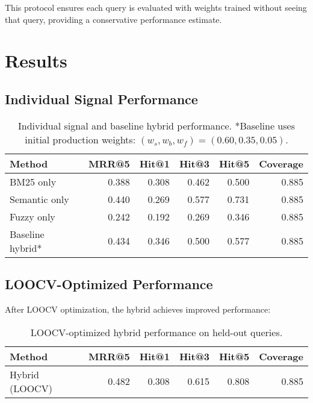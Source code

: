 This protocol ensures each query is evaluated with weights trained without seeing that query, providing a conservative performance estimate.

\section{Results}
\label{sec:evaluation-results}

\subsection{Individual Signal Performance}

\begin{table}[H]
\centering
\small
\begin{tabular}{lrrrrr}
\toprule
\textbf{Method} & \textbf{MRR@5} & \textbf{Hit@1} & \textbf{Hit@3} & \textbf{Hit@5} & \textbf{Coverage} \\
\midrule
BM25 only      & 0.388 & 0.308 & 0.462 & 0.500 & 0.885 \\
Semantic only  & 0.440 & 0.269 & 0.577 & 0.731 & 0.885 \\
Fuzzy only     & 0.242 & 0.192 & 0.269 & 0.346 & 0.885 \\
\addlinespace
Baseline hybrid* & 0.434 & 0.346 & 0.500 & 0.577 & 0.885 \\
\bottomrule
\end{tabular}
\caption{Individual signal and baseline hybrid performance. *Baseline uses initial production weights: $(w_s,w_b,w_f)=(0.60,0.35,0.05)$.}
\label{tab:baselines}
\end{table}

\subsection{LOOCV-Optimized Performance}

After LOOCV optimization, the hybrid achieves improved performance:

\begin{table}[H]
\centering
\small
\begin{tabular}{lrrrrr}
\toprule
\textbf{Method} & \textbf{MRR@5} & \textbf{Hit@1} & \textbf{Hit@3} & \textbf{Hit@5} & \textbf{Coverage} \\
\midrule
Hybrid (LOOCV) & 0.482 & 0.308 & 0.615 & 0.808 & 0.885 \\
\bottomrule
\end{tabular}
\caption{LOOCV-optimized hybrid performance on held-out queries.}
\label{tab:loocv}
\end{table}

